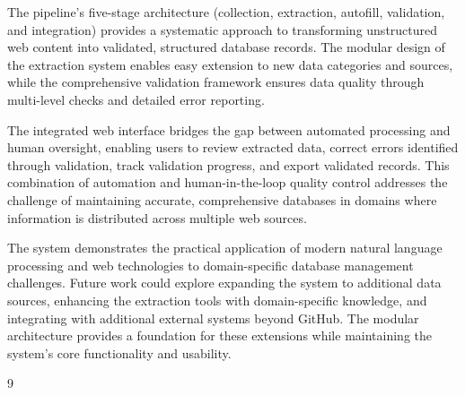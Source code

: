\documentclass[11pt]{article}
\begin{document}
The pipeline's five-stage architecture (collection, extraction, autofill, validation, and integration) provides a systematic approach to transforming unstructured web content into validated, structured database records. The modular design of the extraction system enables easy extension to new data categories and sources, while the comprehensive validation framework ensures data quality through multi-level checks and detailed error reporting.

The integrated web interface bridges the gap between automated processing and human oversight, enabling users to review extracted data, correct errors identified through validation, track validation progress, and export validated records. This combination of automation and human-in-the-loop quality control addresses the challenge of maintaining accurate, comprehensive databases in domains where information is distributed across multiple web sources.

The system demonstrates the practical application of modern natural language processing and web technologies to domain-specific database management challenges. Future work could explore expanding the system to additional data sources, enhancing the extraction tools with domain-specific knowledge, and integrating with additional external systems beyond GitHub. The modular architecture provides a foundation for these extensions while maintaining the system's core functionality and usability.

\begin{thebibliography}{9}
\end{thebibliography}
\end{document}
